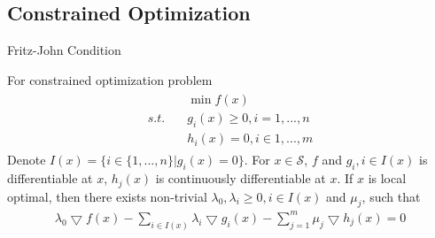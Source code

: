 \subsection{Constrained Optimization}


\begin{theorem}{Fritz-John Condition}
    \par
    For constrained optimization problem
    \begin{align}
        \begin{array}{lll}
            & \min f(x) \\
            s.t.\quad & g_i(x) \geq 0, i = 1,..., n \\
            & h_i(x) = 0, i \in 1, ..., m
        \end{array}
        \label{pro:fz-condition}
    \end{align}
    Denote $I(x) = \{i \in \{1,...,n\} | g_i(x) = 0\}$.
    For $x \in \mathcal{S}$, $f$ and $g_i, i \in I(x)$
    is differentiable at $x$, $h_j(x)$ is continuously
    differentiable at $x$.
    If $x$ is local optimal, then there exists non-trivial
    $\lambda_0, \lambda_i \geq 0, i \in I(x)$
    and $\mu_j$, such that
    \begin{align}
        \lambda_0 \bigtriangledown f(x) - \sum_{i \in I(x)} \lambda_i
        \bigtriangledown g_i(x) - \sum_{j=1}^m \mu_j
        \bigtriangledown h_j(x) = 0
    \end{align}
\end{theorem}

